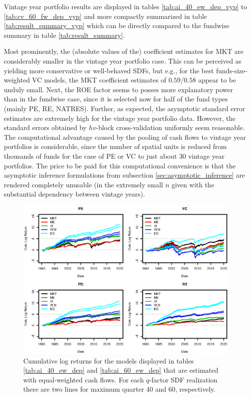 \documentclass[12pt]{article}
\begin{document}
Vintage year portfolio results are displayed in tables \ref{tab:ai_40_ew_dep_vyp} to \ref{tab:cv_60_fw_dep_vyp} and more compactly summarized in table \ref{tab:result_summary_vyp} which can be directly compared to the fundwise summary in table \ref{tab:result_summary}.

Most prominently, the (absolute values of the) coefficient estimates for MKT are considerably smaller in the vintage year portfolio case.
This can be perceived as yielding more conservative or well-behaved SDFs, but e.g., for the best funds-size-weighted VC models, the MKT coefficient estimates of $0.59$/$0.58$ appear to be unduly small.
Next, the ROE factor seems to posses more explanatory power than in the fundwise case, since it is selected now for half of the fund types (mainly PE, RE, NATRES).
Further, as expected, the asymptotic standard error estimates are extremely high for the vintage year portfolio data.
However, the standard errors obtained by $hv$-block cross-validation uniformly seem reasonable.
The computational advantage caused by the pooling of cash flows to vintage year portfolios is considerable, since the number of spatial units is reduced from  thousands of funds for the case of PE or VC to just about 30 vintage year portfolios.
The price to be paid for this computational convenience is that the asymptotic inference formulations from subsection \ref{sec:asymptotic_inference} are rendered completely unusable (in the extremely small $n$ given with the substantial dependency between vintage years).

\begin{figure}[h]
	\centering
	\includegraphics{eps/0_SDF_realizations_EW}
	\caption{Cumulative log returns for the models displayed in tables \ref{tab:ai_40_ew_dep} and  \ref{tab:ai_60_ew_dep} that are estimated with equal-weighted cash flows.
	For each $q$-factor SDF realization there are two lines for maximum quarter 40 and 60, respectively.	
}
	\label{fig:NPV_historgram}
\end{figure}
\end{document}
